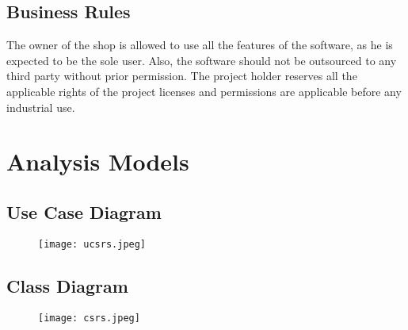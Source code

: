 \documentclass{scrreprt}
\begin{document}
\section{Business Rules}

The owner of the shop is allowed to use all the features of the software, as he is expected to be the sole user. Also, the software should not be outsourced to any third party without prior permission. The project holder reserves all the applicable rights of the project licenses and permissions are applicable before any industrial use.

\chapter{Analysis Models}

\section{Use Case Diagram}

\begin{center}
    \begin{figure}[h]
        \centering
        \texttt{[image: ucsrs.jpeg]}
    \end{figure}
\end{center}

\pagebreak

\section{Class Diagram}

\begin{centering}
    \begin{figure}[h]
        \centering
        \texttt{[image: csrs.jpeg]}
    \end{figure}
\end{centering}
\end{document}
